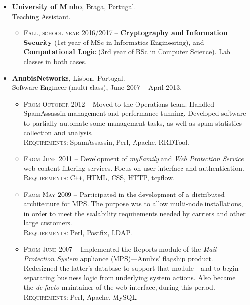\documentclass[a4paper,10pt]{extarticle}
\newenvironment{topic}[1]
   {{\noindent\large\bfseries\raisebox{0pt}[\height][1ex]{#1}\hrule\par}%
    \begin{list}{}{%
       \setlength{\leftmargin}{.0cm}}\item[]}
   {\end{list}\medskip}
\begin{document}
\begin{topic}{Professional Experience}
  \begin{itemize}[leftmargin=*]
    \item {\bfseries University of Minho}, Braga, Portugal.\\
			Teaching Assistant.
			\begin{itemize}
				\item {\scshape Fall, school year 2016/2017} -- \textbf{Cryptography and 
					Information Security} (1st year of MSc in Informatics Engineering), 
					and \textbf{Computational Logic} (3rd year of BSc in Computer 
					Science). Lab classes in both cases.
			\end{itemize}
    \item {\bfseries AnubisNetworks}, Lisbon, Portugal.\\
      Software Engineer (multi-class), June 2007 -- April 2013.
      \begin{itemize}
				\item {\scshape From October 2012} -- Moved to the Operations team. 
					Handled SpamAssassin management and performance tunning. Developed 
					software to partially automate some management tasks, as well as spam 
					statistics collection and analysis.\\
					{\scshape Requirements}: SpamAssassin, Perl, Apache, RRDTool.
				\item {\scshape From June 2011} -- Development of \emph{myFamily} and \emph{Web 
					Protection Service} web content filtering services. Focus on user 
					interface and authentication.\\
					{\scshape Requirements}: C{}\verb!++!, HTML, CSS, HTTP, tcpflow.
				\item {\scshape From May 2009} -- Participated in the development of a distributed 
					architecture for MPS. The purpose was to allow multi-node 
					installations, in order to meet the scalability requirements needed by 
					carriers and other large customers.\\
					{\scshape Requirements}: Perl, Postfix, LDAP.
				\item {\scshape From June 2007} -- Implemented the Reports 
					module of the \emph{Mail Protection 
					System}\textsuperscript{\texttrademark} appliance (MPS)---Anubis' 
					flagship product. Redesigned the latter's database to support that 
					module---and to begin separating business logic from underlying system 
					actions. Also became the \emph{de facto} maintainer of the web 
					interface, during this period.\\
					{\scshape Requirements}: Perl, Apache, MySQL.
      \end{itemize}
  \end{itemize}
\end{topic}
\end{document}
